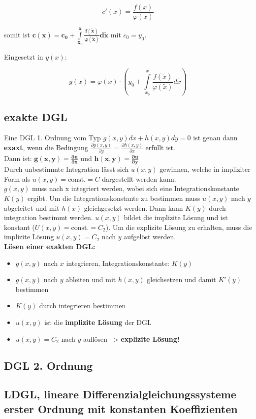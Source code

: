 \[c'(x)=\frac{f(x)}{\varphi(x)}\]

somit ist $\bm{c(x) = c_0 + \int\limits_{x_0}^x\frac{f(\tilde{x})}{\varphi(\tilde{x})}d\tilde{x}}$ mit $c_0 = y_0$. 

Eingesetzt in $y(x)$:

\[
    y(x) = \varphi(x) \cdot \left( y_0+\int\limits_{x_0}^x\frac{f(\tilde{x})}{\varphi(\tilde{x})}d\tilde{x}\right)
\]

\subsection{exakte DGL}
Eine DGL 1. Ordnung vom Typ $g(x,y)dx + h(x,y)dy = 0$ ist genau dann \textbf{exaxt}, wenn die Bedingung $\frac{\partial g(x,y)}{\partial y} = \frac{\partial h (x,y)}{\partial x}$ erfüllt ist.\\

Dann ist: $\bm{g(x,y) = \frac{\partial u}{ \partial x}}$ und $\bm{h(x,y) = \frac{\partial u}{ \partial y}}$\\

Durch unbestimmte Integration lässt sich $u(x,y)$ gewinnen, welche in impliziter Form als $u(x,y) = \text{const.} = C$ dargestellt werden kann.\\

$g(x,y)$ muss nach x integriert werden, wobei sich eine Integrationskonstante $K(y)$ ergibt. Um die Integrationskonstante zu bestimmen muss $u(x,y)$ nach $y$ abgeleitet und mit $h(x)$ gleichgesetzt werden. Dann kann $K(y)$ durch integration bestimmt werden. $u(x,y)$ bildet die implizite Lösung und ist konstant ($U(x,y) = \text{const.} = C_2$). Um die explizite Lösung zu erhalten, muss die implizite Lösung $u(x,y) = C_2$ nach $y$ aufgelöst werden.\\

\textbf{Lösen einer exakten DGL:}
\begin{itemize}
    \item $g(x,y)$ nach $x$ integrieren, Integrationskonstante: $K(y)$
    \item $g(x,y)$ nach $y$ ableiten und mit $h(x,y)$ gleichsetzen und damit $K'(y)$ bestimmen
    \item $K(y)$ durch integrieren bestimmen
    \item $u(x,y)$ ist die \textbf{implizite Lösung} der DGL
    \item $u(x,y) = C_2$ nach $y$ auflösen --> \textbf{explizite Lösung!}
\end{itemize}

\subsection{DGL 2. Ordnung}


\subsection{LDGL, lineare Differenzialgleichungssysteme erster Ordnung mit konstanten Koeffizienten}







